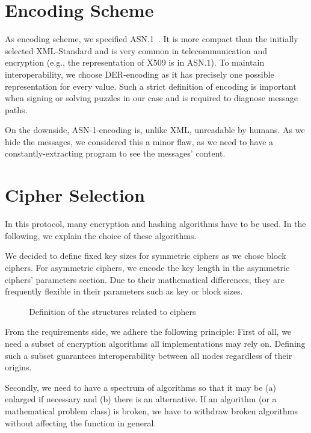 \section{Encoding Scheme}
As encoding scheme, we specified ASN.1~\cite{dis19878824}. It is more compact than the initially selected XML-Standard and is very common in telecommunication and encryption (e.g., the representation of X509 is in ASN.1). To maintain interoperability, we choose DER-encoding as it has precisely one possible representation for every value. Such a strict definition of encoding is important when signing or solving puzzles in our case and is required to diagnose message paths.

On the downside, ASN-1-encoding is, unlike XML, unreadable by humans. As we hide the messages, we considered this a minor flaw, as we need to have a constantly-extracting program to see the messages' content.

\section{Cipher Selection}
In this protocol, many encryption and hashing algorithms have to be used. In the following, we explain the choice of these algorithms. 

We decided to define fixed key sizes for symmetric ciphers as we chose block ciphers. For asymmetric ciphers, we encode the key length in the asymmetric ciphers' parameters section. Due to their mathematical differences, they are frequently flexible in their parameters such as key or block sizes. %

\begin{figure}[ht]
	
	\caption{Definition of the structures related to ciphers}
	\label{fig:defCiphers}
\end{figure}

From the requirements side, we adhere the following principle:
First of all, we need a subset of encryption algorithms all implementations may rely on. Defining such a subset guarantees interoperability between all nodes regardless of their origins. 

Secondly, we need to have a spectrum of algorithms so that it may be (a) enlarged if necessary and (b) there is an alternative. If an algorithm (or a mathematical problem class) is broken, we have to withdraw broken algorithms without affecting the function in general. 

